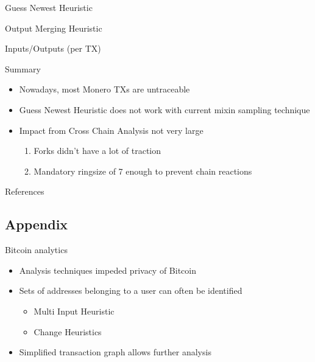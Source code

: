 \begin{frame}{Guess Newest Heuristic}
	\def\imgFile{./img/slides/guess_newest.tex}
	
\end{frame}
\begin{frame}{Output Merging Heuristic}
	\def\imgFile{./img/slides/merge_stats.tex}
	
\end{frame}
\begin{frame}{Inputs/Outputs (per TX)}
	\def\imgFile{./img/slides/inputs.tex}
	
\end{frame}


\begin{frame}{Summary}
	\begin{itemize}[<+->]
		\item Nowadays, most Monero TXs are untraceable
		\item Guess Newest Heuristic does not work with current mixin sampling technique
		\item Impact from Cross Chain Analysis not very large
		\begin{enumerate}
			\item Forks didn't have a lot of traction
			\item Mandatory ringsize of 7 enough to prevent chain reactions
		\end{enumerate}
	\end{itemize}
\end{frame}


\begin{frame}[allowframebreaks]{References}
    
    
\end{frame}

\subsection{Appendix}
\begin{frame}{Bitcoin analytics}
	\begin{itemize}
		\item Analysis techniques impeded privacy of Bitcoin
		\item Sets of addresses belonging to a user can often be identified 
		\begin{itemize}
			\item Multi Input Heuristic
			\item Change Heuristics
		\end{itemize}
		\item Simplified transaction graph allows further analysis
	\end{itemize}
\end{frame}

